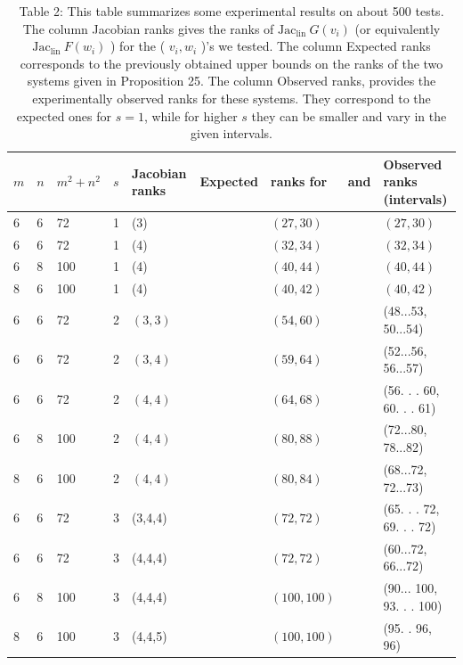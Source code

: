 \documentclass[10pt]{article}
\begin{document}
\begin{table}[h]
\begin{center}
\begin{tabular}{|l|l|l|l|l|l|l|l|l|}
\hline
$m$ & $n$ & $m^{2}+n^{2}$ & $s$ & Jacobian ranks & Expected & ranks for & and & Observed ranks (intervals) \\
\hline
6 & 6 & 72 & 1 & (3) &  & $(27,30)$ &  & $(27,30)$ \\
\hline
6 & 6 & 72 & 1 & (4) &  & $(32,34)$ &  & $(32,34)$ \\
\hline
6 & 8 & 100 & 1 & (4) &  & $(40,44)$ &  & $(40,44)$ \\
\hline
8 & 6 & 100 & 1 & (4) &  & $(40,42)$ &  & $(40,42)$ \\
\hline
6 & 6 & 72 & 2 & $(3,3)$ &  & $(54,60)$ &  & (48...53, 50...54) \\
\hline
6 & 6 & 72 & 2 & $(3,4)$ &  & $(59,64)$ &  & (52...56, 56...57) \\
\hline
6 & 6 & 72 & 2 & $(4,4)$ &  & $(64,68)$ &  & (56. . . 60, 60. . . 61) \\
\hline
6 & 8 & 100 & 2 & $(4,4)$ &  & $(80,88)$ &  & (72...80, 78...82) \\
\hline
8 & 6 & 100 & 2 & $(4,4)$ &  & $(80,84)$ &  & (68...72, 72...73) \\
\hline
6 & 6 & 72 & 3 & (3,4,4) &  & $(72,72)$ &  & (65. . . 72, 69. . . 72) \\
\hline
6 & 6 & 72 & 3 & (4,4,4) &  & $(72,72)$ &  & (60...72, 66...72) \\
\hline
6 & 8 & 100 & 3 & (4,4,4) &  & $(100,100)$ &  & (90... 100, 93. . . 100) \\
\hline
8 & 6 & 100 & 3 & (4,4,5) &  & $(100,100)$ &  & (95. . 96, 96) \\
\hline
\end{tabular}
\captionsetup{labelformat=empty}
\caption{Table 2: This table summarizes some experimental results on about 500 tests. The column Jacobian ranks gives the ranks of $\mathrm{Jac}_{\text {lin }} G\left(v_{i}\right)$ (or equivalently $\mathrm{Jac}_{\text {lin }} F\left(w_{i}\right)$ ) for the ( $v_{i}, w_{i}$ )'s we tested. The column Expected ranks corresponds to the previously obtained upper bounds on the ranks of the two systems given in Proposition 25. The column Observed ranks, provides the experimentally observed ranks for these systems. They correspond to the expected ones for $s=1$, while for higher $s$ they can be smaller and vary in the given intervals.}
\end{center}
\end{table}
\end{document}

